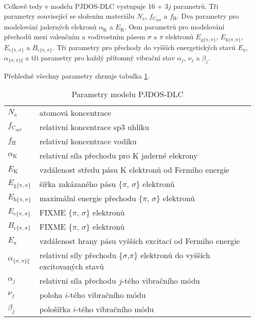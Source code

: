 Celkově tedy v modelu PJDOS-DLC vystupuje 16 + 3$j$ parametrů. Tři parametry související se složením materiálu $N_\mathrm{a}$, $f_\mathrm{C_{sp3}}$ a $f_\mathrm{H}$. Dva parametry pro modelování jaderných elekronů $\alpha_\mathrm{K}$ a $E_\mathrm{K}$. Osm parametrů pro modelování přechodů mezi valenčním a vodivostním pásem $\sigma$ a $\pi$ elektronů $E_\mathrm{g\{\pi,\sigma\}}$, $E_\mathrm{h\{\pi,\sigma\}}$, $E_\mathrm{c\{\pi,\sigma\}}$ a $B_\mathrm{c\{\pi,\sigma\}}$. Tři parametry pro přechody do vyšších energetických stavů $E_\mathrm{x}$, $\alpha_{\{\sigma,\pi\}\xi}$ a tři parametry pro každý přítomný vibrační stav $\alpha_j$, $\nu_j$ a $\beta_j$.

Přehledně všechny parametry shrnuje tabulka \ref{DLCparametry}.

\begin{table}
\centering
\begin{tabular}{l l}
\hline

$N_\mathrm{a}$ & atomová koncentrace \\
$f_\mathrm{C_{sp3}}$ & relativní koncentrace sp3 uhlíku \\
$f_\mathrm{H}$ & relativní koncentrace vodíku \\

$\alpha_\mathrm{K}$ & relativní síla přechodu pro K jaderné elekrony\\
$E_\mathrm{K}$ & vzdálenost středu pásu K elektronů od Fermiho energie\\

$E_\mathrm{g\{\pi,\sigma\}}$ & šířka zakázaného pásu \{$\pi$, $\sigma$\} elektronů\\
$E_\mathrm{h\{\pi,\sigma\}}$ & maximální energie přechodu \{$\pi$, $\sigma$\} elektronů\\
$E_\mathrm{c\{\pi,\sigma\}}$ & FIXME \{$\pi$, $\sigma$\} elektronů\\
$B_\mathrm{c\{\pi,\sigma\}}$ & FIXME \{$\pi$, $\sigma$\} elektronů\\

$E_\mathrm{x}$ & vzdálenost hrany pásu vyšších excitací od Fermiho energie\\
$\alpha_{\{\sigma,\pi\}\xi}$ & relativní síly přechodu \{$\sigma$,$\pi$\} elektronů do vyšších excitovaných stavů \\

$\alpha_j$ & relativní síla přechodu $j$-tého vibračního módu \\
$\nu_j$ & poloha $i$-tého vibračního módu\\
$\beta_j$ & pološířka $i$-tého vibračního módu\\
\hline

\end{tabular}
\label{DLCparametry}
\caption{Parametry modelu PJDOS-DLC}
\end{table}

